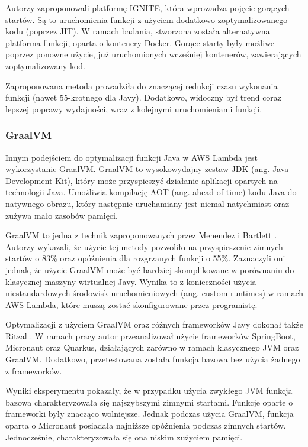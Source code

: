 Autorzy zaproponowali platformę IGNITE, która wprowadza pojęcie gorących startów. Są to uruchomienia funkcji z użyciem dodatkowo zoptymalizowanego kodu (poprzez JIT).
W ramach badania, stworzona została alternatywna platforma funkcji, oparta o kontenery Docker. 
Gorące starty były możliwe poprzez ponowne użycie, już uruchomionych wcześniej kontenerów, zawierających zoptymalizowany kod.

Zaproponowana metoda prowadziła do znaczącej redukcji czasu wykonania funkcji (nawet 55-krotnego dla Javy). 
Dodatkowo, widoczny był trend coraz lepszej poprawy wydajności, wraz z kolejnymi uruchomieniami funkcji.

\subsubsection*{GraalVM}

Innym podejściem do optymalizacji funkcji Java w AWS Lambda jest wykorzystanie GraalVM.
GraalVM to wysokowydajny zestaw JDK (ang. Java Development Kit), który może przyspieszyć działanie aplikacji opartych na technologii Java.
Umożliwia kompilację AOT (ang. ahead-of-time) kodu Java do natywnego obrazu, który następnie uruchamiany jest niemal natychmiast oraz zużywa mało zasobów pamięci.

GraalVM to jedna z technik zaproponowanych przez Menendez i Bartlett \cite{menéndez2023performancebestpracticesusing}.
Autorzy wykazali, że użycie tej metody pozwoliło na przyspieszenie zimnych startów o 83\% oraz opóźnienia dla rozgrzanych funkcji o 55\%.
Zaznaczyli oni jednak, że użycie GraalVM może być bardziej skomplikowane w porównaniu do klasycznej maszyny wirtualnej Javy. 
Wynika to z konieczności użycia niestandardowych środowisk uruchomieniowych (ang. custom runtimes) w ramach AWS Lambda, które muszą zostać skonfigurowane przez programistę.

Optymalizacji z użyciem GraalVM oraz różnych frameworków Javy dokonał także Ritzal \cite{ritzal2020optimizing}.
W ramach pracy autor przeanalizował użycie frameworków SpringBoot, Micronaut oraz Quarkus, działających zarówno w ramach klasycznego JVM oraz GraalVM.
Dodatkowo, przetestowana została funkcja bazowa bez użycia żadnego z frameworków.

Wyniki eksperymentu pokazały, że w przypadku użycia zwykłego JVM funkcja bazowa charakteryzowała się najszybszymi zimnymi startami.
Funkcje oparte o frameworki były znacząco wolniejsze. Jednak podczas użycia GraalVM, funkcja oparta o Micronaut posiadała najniższe opóźnienia podczas zimnych startów.
Jednocześnie, charakteryzowała się ona niskim zużyciem pamięci.

